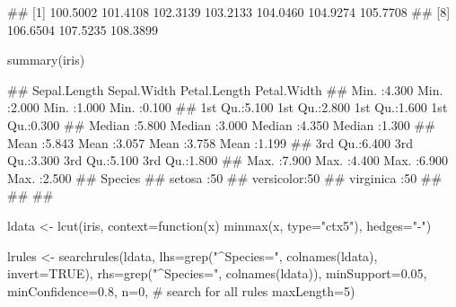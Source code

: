 \documentclass{article}\usepackage[]{graphicx}\usepackage[]{color}
\begin{document}
\begin{Schunk}
% --begin: "frbe"
\begin{Soutput}
##  [1] 100.5002 101.4108 102.3139 103.2133 104.0460 104.9274 105.7708
##  [8] 106.6504 107.5235 108.3899
\end{Soutput}
%
% --end: "frbe"
\end{Schunk}

\begin{Schunk}
% --begin: "casestudy-assoc-iris"
\begin{Sinput}
summary(iris)
\end{Sinput}
\begin{Soutput}
##   Sepal.Length    Sepal.Width     Petal.Length    Petal.Width   
##  Min.   :4.300   Min.   :2.000   Min.   :1.000   Min.   :0.100  
##  1st Qu.:5.100   1st Qu.:2.800   1st Qu.:1.600   1st Qu.:0.300  
##  Median :5.800   Median :3.000   Median :4.350   Median :1.300  
##  Mean   :5.843   Mean   :3.057   Mean   :3.758   Mean   :1.199  
##  3rd Qu.:6.400   3rd Qu.:3.300   3rd Qu.:5.100   3rd Qu.:1.800  
##  Max.   :7.900   Max.   :4.400   Max.   :6.900   Max.   :2.500  
##        Species  
##  setosa    :50  
##  versicolor:50  
##  virginica :50  
##                 
##                 
## 
\end{Soutput}
%
% --end: "casestudy-assoc-iris"
\end{Schunk}

\begin{Schunk}
% --begin: "casestudy-assoc-lcut"
\begin{Sinput}
ldata <- lcut(iris,
              context=function(x) minmax(x, type="ctx5"),
              hedges="-")
\end{Sinput}
%
% --end: "casestudy-assoc-lcut"
\end{Schunk}

\begin{Schunk}
% --begin: "casestudy-assoc-searchrules"
\begin{Sinput}
lrules <- searchrules(ldata,
                      lhs=grep("^Species=", colnames(ldata), invert=TRUE),
                      rhs=grep("^Species=", colnames(ldata)),
                      minSupport=0.05,
                      minConfidence=0.8,
                      n=0, # search for all rules
                      maxLength=5)
\end{Sinput}
%
% --end: "casestudy-assoc-searchrules"
\end{Schunk}
\end{document}
